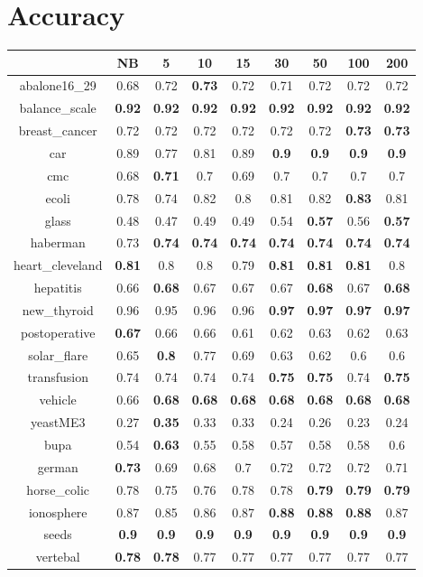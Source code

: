 \documentclass{article}%
\begin{document}
%
\normalsize%
\section*{Accuracy}%
\begin{tabular}{c|cccccccc}%
\hline%
&NB&5&10&15&30&50&100&200\\%
\hline%
abalone16\_29&0.68&0.72&\textbf{0.73}&0.72&0.71&0.72&0.72&0.72\\%
\hline%
balance\_scale&\textbf{0.92}&\textbf{0.92}&\textbf{0.92}&\textbf{0.92}&\textbf{0.92}&\textbf{0.92}&\textbf{0.92}&\textbf{0.92}\\%
\hline%
breast\_cancer&0.72&0.72&0.72&0.72&0.72&0.72&\textbf{0.73}&\textbf{0.73}\\%
\hline%
car&0.89&0.77&0.81&0.89&\textbf{0.9}&\textbf{0.9}&\textbf{0.9}&\textbf{0.9}\\%
\hline%
cmc&0.68&\textbf{0.71}&0.7&0.69&0.7&0.7&0.7&0.7\\%
\hline%
ecoli&0.78&0.74&0.82&0.8&0.81&0.82&\textbf{0.83}&0.81\\%
\hline%
glass&0.48&0.47&0.49&0.49&0.54&\textbf{0.57}&0.56&\textbf{0.57}\\%
\hline%
haberman&0.73&\textbf{0.74}&\textbf{0.74}&\textbf{0.74}&\textbf{0.74}&\textbf{0.74}&\textbf{0.74}&\textbf{0.74}\\%
\hline%
heart\_cleveland&\textbf{0.81}&0.8&0.8&0.79&\textbf{0.81}&\textbf{0.81}&\textbf{0.81}&0.8\\%
\hline%
hepatitis&0.66&\textbf{0.68}&0.67&0.67&0.67&\textbf{0.68}&0.67&\textbf{0.68}\\%
\hline%
new\_thyroid&0.96&0.95&0.96&0.96&\textbf{0.97}&\textbf{0.97}&\textbf{0.97}&\textbf{0.97}\\%
\hline%
postoperative&\textbf{0.67}&0.66&0.66&0.61&0.62&0.63&0.62&0.63\\%
\hline%
solar\_flare&0.65&\textbf{0.8}&0.77&0.69&0.63&0.62&0.6&0.6\\%
\hline%
transfusion&0.74&0.74&0.74&0.74&\textbf{0.75}&\textbf{0.75}&0.74&\textbf{0.75}\\%
\hline%
vehicle&0.66&\textbf{0.68}&\textbf{0.68}&\textbf{0.68}&\textbf{0.68}&\textbf{0.68}&\textbf{0.68}&\textbf{0.68}\\%
\hline%
yeastME3&0.27&\textbf{0.35}&0.33&0.33&0.24&0.26&0.23&0.24\\%
\hline%
bupa&0.54&\textbf{0.63}&0.55&0.58&0.57&0.58&0.58&0.6\\%
\hline%
german&\textbf{0.73}&0.69&0.68&0.7&0.72&0.72&0.72&0.71\\%
\hline%
horse\_colic&0.78&0.75&0.76&0.78&0.78&\textbf{0.79}&\textbf{0.79}&\textbf{0.79}\\%
\hline%
ionosphere&0.87&0.85&0.86&0.87&\textbf{0.88}&\textbf{0.88}&\textbf{0.88}&0.87\\%
\hline%
seeds&\textbf{0.9}&\textbf{0.9}&\textbf{0.9}&\textbf{0.9}&\textbf{0.9}&\textbf{0.9}&\textbf{0.9}&\textbf{0.9}\\%
\hline%
vertebal&\textbf{0.78}&\textbf{0.78}&0.77&0.77&0.77&0.77&0.77&0.77\\%
\hline%
\end{tabular}
\end{document}
